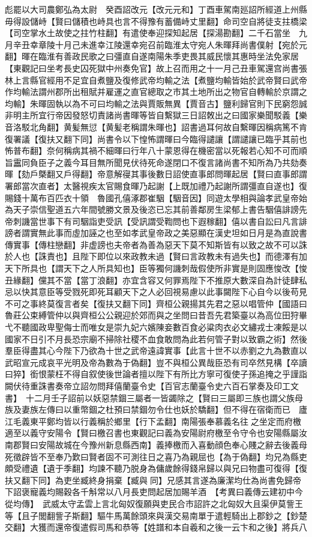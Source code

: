 彪罷以大司農鄭弘為太尉　癸酉詔改元【改元元和】丁酉車駕南廵詔所經道上州縣毋得設儲峙【賢曰儲積也峙具也言不得豫有蓄備峙丈里翻】命司空自將徒支拄橋梁【司空掌水土故使之拄竹柱翻】有遣使奉迎探知起居【探湯勘翻】二千石當坐　九月辛丑幸章陵十月己未進幸江陵還幸宛召前臨淮太守宛人朱暉拜尚書僕射【宛於元翻】暉在臨淮有善政民歌之曰彊直自遂南陽朱季吏畏其威民懷其惠時坐法免家居【東觀記曰坐考長史囚死獄中州奏免官】故上召而用之十一月己丑車駕還宫尚書張林上言縣官經用不足宜自煮鹽及復修武帝均輸之法【煮鹽均輸皆始於武帝賢曰武帝作均輸法謂州郡所出租賦并雇運之直官總取之市其土地所出之物官自轉輸於京謂之均輸】朱暉固執以為不可曰均輸之法與賈販無異【賈音古】鹽利歸官則下民窮怨誠非明主所宜行帝因發怒切責諸尚書暉等皆自繫獄三日詔敇出之曰國家樂聞駁義【樂音洛駁北角翻】黄髪無愆【黄髪老稱謂朱暉也】詔書過耳何故自繫暉因稱病篤不肯復署議【復扶又翻下同】尚書令以下惶怖謂暉曰今臨得譴讓【謂譴讓已臨乎其前也怖普布翻】奈何稱病其禍不細暉曰行年八十蒙恩得在機密當以死報若心知不可而順旨靁同負臣子之義今耳目無所聞見伏待死命遂閉口不復言諸尚書不知所為乃共劾奏暉【劾戶槩翻又戶得翻】帝意解寑其事後數日詔使直事郎問暉起居【賢曰直事郎謂署郎當次直者】太醫視疾太官賜食暉乃起謝【上既加禮乃起謝所謂彊直自遂也】復賜錢十萬布百匹衣十領　魯國孔僖涿郡崔駰【駰音因】同遊太學相與論孝武皇帝始為天子崇信聖道五六年間號勝文景及後恣已忘其前善鄰房生梁郁上書告駰僖誹謗先帝刺譏當世事下有司駰詣吏受訊【受訊謂受鞫問也下遐稼翻】僖以書自訟曰凡言誹謗者謂實無此事而虛加誣之也至如孝武皇帝政之美惡顯在漢史坦如日月是為直說書傳實事【傳柱戀翻】非虚謗也夫帝者為善為惡天下莫不知斯皆有以致之故不可以誅於人也【誅責也】且陛下即位以來政教未過【賢曰言政教未有過失也】而德澤有加天下所具也【謂天下之人所具知也】臣等獨何譏刺哉假使所非實是則固應悛改【悛丑緣翻】儻其不當【當丁浪翻】亦宜含容又何罪焉陛下不推原大數深自為計徒肆私忌以快其意臣等受戮死即死耳顧天下之人必回視易慮以此事闚陛下心自今以後苟見不可之事終莫復言者矣【復扶又翻下同】齊桓公親揚其先君之惡以唱管仲【國語曰魯莊公束縛管仲以與齊桓公公親迎於郊而與之坐問曰昔吾先君築臺以為高位田狩畢弋不聽國政卑聖侮士而唯女是崇九妃六嬪陳妾數百食必粱肉衣必文繡戎士凍餒是以國家不日引不月長恐宗廟不掃除社稷不血食敢問為此若何管子對以致霸之術】然後羣臣得盡其心今陛下乃欲為十世之武帝遠諱實事【此言十世不以赤劉之九為數直以武昭宣元成哀平光明及帝為數為于偽翻】豈不與桓公異哉臣恐有司卒然見構【卒讀曰猝】銜恨蒙枉不得自叙使後世論者擅以陛下有所比方寧可復使子孫追掩之乎謹詣闕伏待重誅書奏帝立詔勿問拜僖蘭臺令史【百官志蘭臺令史六百石掌奏及印工文書】　十二月壬子詔前以妖惡禁錮三屬者一皆蠲除之【賢曰三屬即三族也謂父族母族及妻族左傳曰以重幣錮之杜預曰禁錮勿令仕也妖於驕翻】但不得在宿衛而已　廬江毛義東平鄭均皆以行義稱於鄉里【行下孟翻】南陽張奉慕義名往之坐定而府檄適至以義守安陽令【賢曰檄召書也東觀記曰義為安陽尉府檄至令守令也安陽縣屬汝南郡賢曰安陽故城在今豫州新息縣西南】義捧檄而入喜動顔色奉心賤之辭去後義母死徵辟皆不至奉乃歎曰賢者固不可測往日之喜乃為親屈也【為于偽翻】均兄為縣吏頗受禮遺【遺于季翻】均諫不聽乃脱身為傭歲餘得錢帛歸以與兄曰物盡可復得【復扶又翻下同】為吏坐臧終身捐棄【臧與同】兄感其言遂為廉潔均仕為尚書免歸帝下詔褒寵義均賜穀各千斛常以八月長吏問起居加賜羊酒　【考異曰義傳云建初中今從均傳】　武威太守孟雲上言北匈奴復願與吏民合市詔許之北匈奴大且渠伊莫訾王等【且子閭翻訾子斯翻】驅牛馬萬餘頭來與漢交易南單于遣輕騎出上郡鈔之【鈔楚交翻】大獲而還帝復遣假司馬和恭等【姓譜和本自羲和之後一云卞和之後】將兵八

